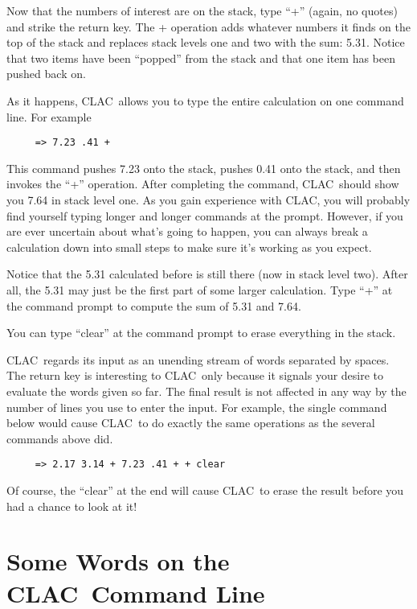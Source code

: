 \documentclass{report}
\newcommand{\CLAC}{CLAC}
\begin{document}
Now that the numbers of interest are on the stack, type ``+'' (again, no quotes) and strike the return key. The + operation adds whatever numbers it finds on the top of the stack and replaces stack levels one and two with the sum: 5.31. Notice that two items have been ``popped'' from the stack and that one item has been pushed back on.

As it happens, \CLAC\ allows you to type the entire calculation on one command line. For example

\begin{verbatim}
     => 7.23 .41 +
\end{verbatim}

This command pushes 7.23 onto the stack, pushes 0.41 onto the stack, and then invokes the ``+'' operation. After completing the command, \CLAC\  should show you 7.64 in stack level one. As you gain experience with \CLAC, you will probably find yourself typing longer and longer commands at the prompt. However, if you are ever uncertain about what's going to happen, you can always break a calculation down into small steps to make sure it's working as you expect.

Notice that the 5.31 calculated before is still there (now in stack level two). After all, the 5.31 may just be the first part of some larger calculation. Type ``+'' at the command prompt to compute the sum of 5.31 and 7.64.

You can type ``clear'' at the command prompt to erase everything in the stack.

\CLAC\ regards its input as an unending stream of words separated by spaces. The return key is interesting to \CLAC\ only because it signals your desire to evaluate the words given so far. The final result is not affected in any way by the number of lines you use to enter the input. For example, the single command below would cause \CLAC\ to do exactly the same operations as the several commands above did.

\begin{verbatim}
     => 2.17 3.14 + 7.23 .41 + + clear
\end{verbatim}

Of course, the ``clear'' at the end will cause \CLAC\ to erase the result before you had a chance to look at it!

\section{Some Words on the \CLAC\ Command Line}
\end{document}
